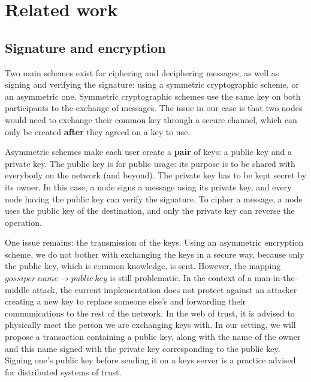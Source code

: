 \documentclass[11pt, a4paper]{article}
\begin{document}



\section{Related work}

    \subsection{Signature and encryption}

        Two main schemes exist for ciphering and deciphering messages, as well as signing and verifying the signature: using a symmetric cryptographic scheme, or an asymmetric one.
        Symmetric cryptographic schemes use the same key on both participants to the exchange of messages.
        The issue in our case is that two nodes would need to exchange their common key through a secure channel, which can only be created \textbf{after} they agreed on a key to use.

        Asymmetric schemes make each user create a \textbf{pair} of keys: a public key and a private key.
        The public key is for public usage: its purpose is to be shared with everybody on the network (and beyond).
        The private key has to be kept secret by its owner.
        In this case, a node signs a message using its private key, and every node having the public key can verify the signature.
        To cipher a message, a node uses the public key of the destination, and only the private key can reverse the operation.

        One issue remains: the transmission of the keys.
        Using an asymmetric encryption scheme, we do not bother with exchanging the keys in a secure way, because only the public key, which is common knowledge, is sent.
        However, the mapping $gossiper~name \rightarrow public~key$ is still problematic.
        In the context of a man-in-the-middle attack, the current implementation does not protect against an attacker creating a new key to replace someone else's and forwarding their communications to the rest of the network.
        In the web of trust, it is advised to physically meet the person we are exchanging keys with.
        In our setting, we will propose a transaction containing a public key, along with the name of the owner and this name signed with the private key corresponding to the public key.
        Signing one's public key before sending it on a keys server is a practice advised for distributed systems of trust.
\end{document}
